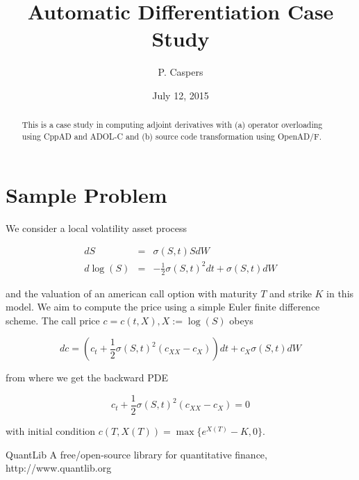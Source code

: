 \documentclass{amsart}
\theoremstyle{plain}
\numberwithin{equation}{section}
\begin{document}
\title[AD]{Automatic Differentiation Case Study}
\author{P. Caspers}
\date{July 12, 2015}
\begin{abstract}
This is a case study in computing adjoint derivatives with (a) operator overloading using CppAD and ADOL-C and (b) source code transformation using OpenAD/F.
\end{abstract}

\maketitle

\tableofcontents

\section{Sample Problem}

We consider a local volatility asset process 

\begin{eqnarray}
dS &=& \sigma(S,t) S dW \\
d\log(S) &=& -\frac{1}{2}\sigma(S,t)^2 dt + \sigma(S,t) dW
\end{eqnarray}

and the valuation of an american call option with maturity $T$ and strike $K$ in this model. We aim to compute the price using a simple Euler finite difference scheme. The call price $c = c(t,X), X:=\log(S)$ obeys

\begin{equation}
dc = \left(c_t + \frac{1}{2} \sigma(S,t)^2 (c_{XX}-c_{X}) \right) dt + c_X \sigma(S,t) dW 
\end{equation}

from where we get the backward PDE

\begin{equation}
c_t + \frac{1}{2}\sigma(S,t)^2(c_{XX}-c_X) = 0
\end{equation}

with initial condition $c(T,X(T)) = \max\{ e^{X(T)}  - K, 0 \}$.





\begin{thebibliography}{2}

QuantLib A free/open-source library for quantitative finance, http://www.quantlib.org

\end{thebibliography}
\end{document}
